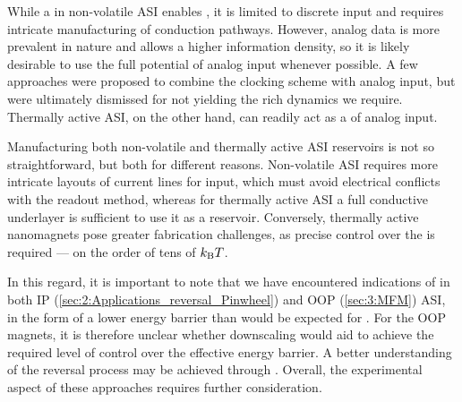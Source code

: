 While a  in non-volatile ASI enables , it is limited to discrete input and requires intricate manufacturing of conduction pathways.
However, analog data is more prevalent in nature and allows a higher information density, so it is likely desirable to use the full potential of analog input whenever possible.
A few approaches were proposed to combine the clocking scheme with analog input, but were ultimately dismissed for not yielding the rich dynamics we require.
Thermally active ASI, on the other hand, can readily act as a  of analog input. \par
Manufacturing both non-volatile and thermally active ASI reservoirs is not so straightforward, but both for different reasons.
Non-volatile ASI requires more intricate layouts of current lines for input, which must avoid electrical conflicts with the readout method, whereas for thermally active ASI a full conductive underlayer is sufficient to use it as a reservoir.
Conversely, thermally active nanomagnets pose greater fabrication challenges, as precise control over the  is required --- on the order of tens of $\kBT$. \par
In this regard, it is important to note that we have encountered indications of  in both IP (\cref{sec:2:Applications_reversal_Pinwheel}) and OOP (\cref{sec:3:MFM}) ASI, in the form of a lower energy barrier than would be expected for .
For the OOP magnets, it is therefore unclear whether downscaling would aid to achieve the required level of control over the effective energy barrier.
A better understanding of the reversal process may be achieved through .
Overall, the experimental aspect of these approaches requires further consideration. \\\par

